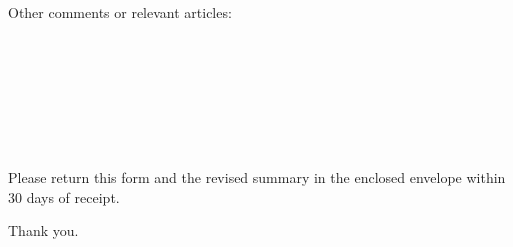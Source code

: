 \documentclass[letterpaper,12pt]{letter}
\begin{document}
\vspace{18pt}

Other comments or relevant articles:

\vspace{12pt}

\makebox[6.5in]{\hrulefill} \\ \\
\makebox[6.5in]{\hrulefill} \\ \\
\makebox[6.5in]{\hrulefill} \\ \\
\makebox[6.5in]{\hrulefill}

\vspace{12pt}

Please return this form and the revised summary in the enclosed envelope
within 30 days of receipt.

Thank you.

\vfill
\end{document}
